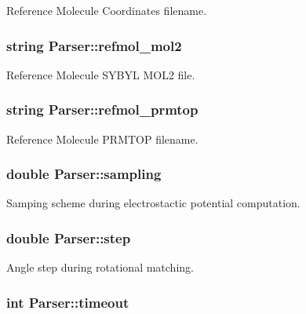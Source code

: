 Reference Molecule Coordinates filename. 

\hypertarget{classParser_a92f17b5998dfe205b33c1713f5a16ab8}{
\subsubsection[{refmol\_\-mol2}]{\setlength{\rightskip}{0pt plus 5cm}string {\bf Parser::refmol\_\-mol2}}}
\label{classParser_a92f17b5998dfe205b33c1713f5a16ab8}


Reference Molecule SYBYL MOL2 file. 

\hypertarget{classParser_a260001029b62071b57edd6c8e66ca02f}{
\subsubsection[{refmol\_\-prmtop}]{\setlength{\rightskip}{0pt plus 5cm}string {\bf Parser::refmol\_\-prmtop}}}
\label{classParser_a260001029b62071b57edd6c8e66ca02f}


Reference Molecule PRMTOP filename. 

\hypertarget{classParser_a0acd57af169e5e9bdcc891ece8336b67}{
\subsubsection[{sampling}]{\setlength{\rightskip}{0pt plus 5cm}double {\bf Parser::sampling}}}
\label{classParser_a0acd57af169e5e9bdcc891ece8336b67}


Samping scheme during electrostactic potential computation. 

\hypertarget{classParser_a9779ee1f5fc41336fe3628451d8dbe15}{
\subsubsection[{step}]{\setlength{\rightskip}{0pt plus 5cm}double {\bf Parser::step}}}
\label{classParser_a9779ee1f5fc41336fe3628451d8dbe15}


Angle step during rotational matching. 

\hypertarget{classParser_a674ed2371f1689ee54cd8b6b29324b65}{
\subsubsection[{timeout}]{\setlength{\rightskip}{0pt plus 5cm}int {\bf Parser::timeout}}}
\label{classParser_a674ed2371f1689ee54cd8b6b29324b65}


